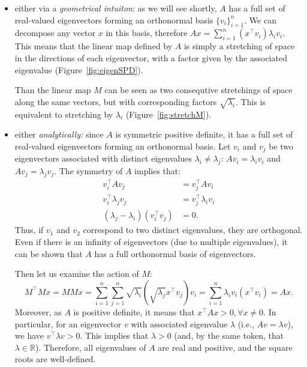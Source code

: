 \documentclass[notitlepage,oneside]{book}
\begin{document}
\begin{itemize}
\item either via a \textit{geometrical intuiton}: as we will see shortly, $A$ has a full set of real-valued eigenvectors forming an orthonormal basis $\{v_i\}_{i=1}^{n}$.
We can decompose any vector $x$ in this basis, therefore $Ax = \sum_{i=1}^{n} (x^\top v_i) \lambda_i v_i$.
This means that the linear map defined by $A$ is simply a stretching of space in the directions of each eigenvector, with a factor given by the associated eigenvalue (Figure~\ref{fig:eigenSPD}).

Than the linear map $M$ can be seen as two consequtive stretchings of space along the same vectors, but with corresponding factors $\sqrt{\lambda_i}$.
This is equivalent to stretching by $\lambda_i$ (Figure~\ref{fig:stretchM}).

\item either \textit{analytically:} since $A$ is symmetric positive definite, it has a full set of real-valued eigenvectors forming an orthonormal basis.
Let $v_i$ and $v_j$ be two eigenvectors associated with distinct eigenvalues $\lambda_i \neq \lambda_j$: $Av_i=\lambda_iv_i$ and $Av_j=\lambda_jv_j$.
The symmetry of $A$ implies that:
\begin{align*}
  v_i^\top A v_j & =  v_j^\top A v_i \\
  v_i^\top \lambda_j v_j & =  v_j^\top \lambda_i v_i \\
  (\lambda_j -\lambda_i) \left(v_i^\top v_j\right)& =  0.
\end{align*}
Thus, if $v_1$ and $v_2$ correspond to two distinct eigenvalues, they are orthogonal.
Even if there is an infinity of eigenvectors (due to multiple eigenvalues), it can be shown that $A$ has a full orthonormal basis of eigenvectors.

Then let us examine the action of $M$:
$$
M^\top Mx =MMx = \sum_{i=1}^{n}\sum_{j=1}^{n}\sqrt{\lambda_i}\left(\sqrt{\lambda_j} x^\top v_j\right) v_i = \sum_{i=1}^{n} \lambda_i v_i \left(x^\top v_i\right) = Ax.
$$
Moreover, as $A$ is positive definite, it means that $x^\top Ax>0, \forall x \neq 0$.
In particular, for an eigenvector $v$ with associated eigenvalue $\lambda$ (i.e., $Av=\lambda v$), 
we have $v^\top \lambda v > 0$. This implies that $\lambda>0$ (and, by the same token, that $\lambda \in \mathbb{R}$). 
Therefore, all eigenvalues of $A$ are real and positive, and the square roots are well-defined.
\end{itemize}
\end{document}
